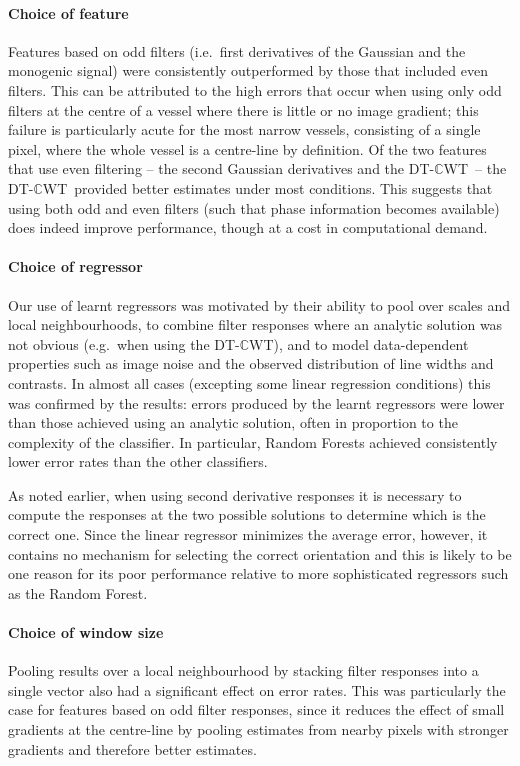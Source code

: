 \documentclass[runningheads,a4paper]{llncs}
\def\dtcwt{DT-$\mathbb{C}$WT}
\def\ie{i.e.}
\def\eg{e.g.}
\begin{document}
\paragraph{Choice of feature}
Features based on odd filters (\ie~first derivatives of the Gaussian and the monogenic signal) were consistently outperformed by those that included even filters. This can be attributed to the high errors that occur when using only odd filters at the centre of a vessel where there is little or no image gradient; this failure is particularly acute for the most narrow vessels, consisting of a single pixel, where the whole vessel is a centre-line by definition. Of the two features that use even filtering -- the second Gaussian derivatives and the \dtcwt~-- the \dtcwt~provided better estimates under most conditions. This suggests that using both odd and even filters (such that phase information becomes available) does indeed improve performance, though at a cost in computational demand.

\paragraph{Choice of regressor}
Our use of learnt regressors was motivated by their ability to pool over scales and local neighbourhoods, to combine filter responses where an analytic solution was not obvious (\eg~when using the \dtcwt), and to model data-dependent properties such as image noise and the observed distribution of line widths and contrasts. In almost all cases (excepting some linear regression conditions) this was confirmed by the results: errors produced by the learnt regressors were lower than those achieved using an analytic solution, often in proportion to the complexity of the classifier. In particular, Random Forests achieved consistently lower error rates than the other classifiers.

As noted earlier, when using second derivative responses it is necessary to compute the responses at the two possible solutions to determine which is the correct one. Since the linear regressor minimizes the average error, however, it contains no mechanism for selecting the correct orientation and this is likely to be one reason for its poor performance relative to more sophisticated regressors such as the Random Forest.

\paragraph{Choice of window size}
Pooling results over a local neighbourhood by stacking filter responses into a single vector also had a significant effect on error rates. This was particularly the case for features based on odd filter responses, since it reduces the effect of small gradients at the centre-line by pooling estimates from nearby pixels with stronger gradients and therefore better estimates.
\end{document}
